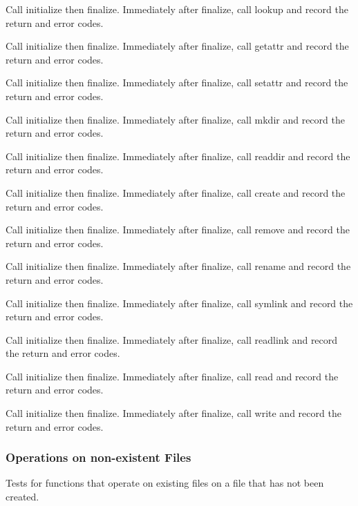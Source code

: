 \documentclass[12pt]{article} %
\begin{document}
\begin{list}{.}{}
\item Call initialize then finalize.  Immediately after finalize, call lookup and record the return and error codes.
\item Call initialize then finalize.  Immediately after finalize, call getattr and record the return and error codes.
\item Call initialize then finalize.  Immediately after finalize, call setattr and record the return and error codes.
\item Call initialize then finalize.  Immediately after finalize, call mkdir and record the return and error codes.
\item Call initialize then finalize.  Immediately after finalize, call readdir and record the return and error codes.
\item Call initialize then finalize.  Immediately after finalize, call create and record the return and error codes.
\item Call initialize then finalize.  Immediately after finalize, call remove and record the return and error codes.
\item Call initialize then finalize.  Immediately after finalize, call rename and record the return and error codes.
\item Call initialize then finalize.  Immediately after finalize, call symlink and record the return and error codes.
\item Call initialize then finalize.  Immediately after finalize, call readlink and record the return and error codes.
\item Call initialize then finalize.  Immediately after finalize, call read and record the return and error codes.
\item Call initialize then finalize.  Immediately after finalize, call write and record the return and error codes.
\end{list}

\subsubsection{Operations on non-existent Files}
Tests for functions that operate on existing files on a file that has not been created.
\end{document}
